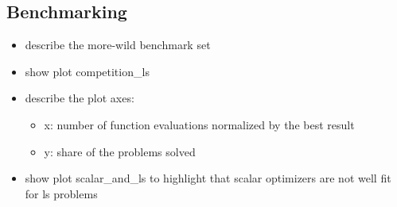 
\subsection{Benchmarking}
\begin{itemize}
    \item describe the more-wild benchmark set
    \item show plot competition\_ls
    \item describe the plot axes:
        \begin{itemize}
            \item x: number of function evaluations normalized by the best result
            \item y: share of the problems solved
        \end{itemize}
    \item show plot scalar\_and\_ls to highlight that scalar optimizers are not well fit for ls problems
\end{itemize}
